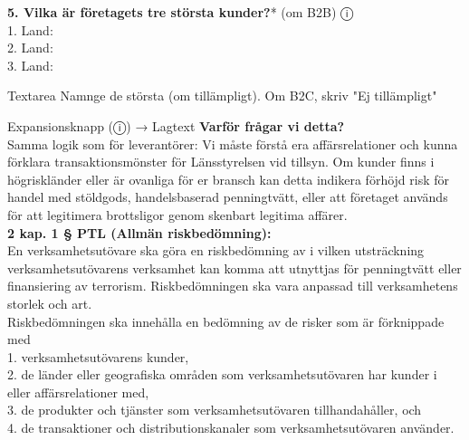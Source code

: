 \documentclass[10pt]{beamer}
\begin{document}
\begin{frame}[label=riskfragor-steg2]
  \vspace{0.2cm}

  \textbf{5. Vilka är företagets tre största kunder?}* (om B2B) \hspace{0.3cm} ⓘ\\
  \tiny 1. \underline{\hspace{5cm}} Land: \underline{\hspace{2cm}}\\
  \tiny 2. \underline{\hspace{5cm}} Land: \underline{\hspace{2cm}}\\
  \tiny 3. \underline{\hspace{5cm}} Land: \underline{\hspace{2cm}}
  \begin{block}{Textarea}
    \tiny Namnge de största (om tillämpligt). Om B2C, skriv "Ej tillämpligt"
  \end{block}
  \begin{alertblock}{Expansionsknapp (ⓘ) → Lagtext}
    \tiny \textbf{Varför frågar vi detta?}\\
    \tiny Samma logik som för leverantörer: Vi måste förstå era affärsrelationer och kunna förklara transaktionsmönster
    för Länsstyrelsen vid tillsyn. Om kunder finns i högriskländer eller är ovanliga för er bransch kan detta indikera
    förhöjd risk för handel med stöldgods, handelsbaserad penningtvätt, eller att företaget används för att legitimera
    brottsligor genom skenbart legitima affärer.\\[0.1cm]
    
    \tiny \textbf{2 kap. 1 § PTL (Allmän riskbedömning):}\\
    \tiny En verksamhetsutövare ska göra en riskbedömning av i vilken utsträckning verksamhetsutövarens
    verksamhet kan komma att utnyttjas för penningtvätt eller finansiering av terrorism. 
    Riskbedömningen ska vara anpassad till verksamhetens storlek och art.\\
    \tiny Riskbedömningen ska innehålla en bedömning av de risker som är förknippade med\\
    \tiny 1. verksamhetsutövarens kunder,\\
    \tiny 2. de länder eller geografiska områden som verksamhetsutövaren har kunder i eller affärsrelationer med,\\
    \tiny 3. de produkter och tjänster som verksamhetsutövaren tillhandahåller, och\\
    \tiny 4. de transaktioner och distributionskanaler som verksamhetsutövaren använder.\\[0.1cm]
    

\end{alertblock}
\end{frame}
\end{document}
